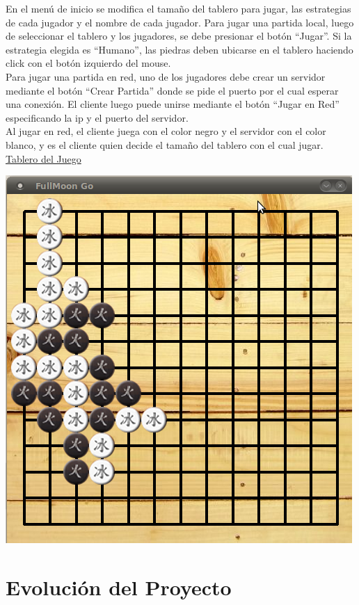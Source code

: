 \documentclass[11pt]{article}
\begin{document}
En el men\'u de inicio se modifica el tama\~no del tablero para jugar, las estrategias de cada jugador y el nombre de cada jugador.
Para jugar una partida local, luego de seleccionar el tablero y los jugadores, se debe presionar el bot\'on ``Jugar''. Si la estrategia
elegida es ``Humano'', las piedras deben ubicarse en el tablero haciendo click con el bot\'on izquierdo del mouse. \\
Para jugar una partida en red, uno de los jugadores debe crear un servidor mediante el bot\'on ``Crear Partida'' donde se pide
el puerto por el cual esperar una conexi\'on. El cliente luego puede unirse mediante el bot\'on ``Jugar en Red'' especificando
la ip y el puerto del servidor.\\ 
Al jugar en red, el cliente juega con el color negro y el servidor con el color blanco, y es el cliente quien decide
el tama\~no del tablero con el cual jugar.\\


\underline{Tablero del Juego}
\begin{center}
 \includegraphics[scale=0.55]{./Diagramas/captura_tablero.png}
\end{center}

\newpage
\section{Evoluci\'on del Proyecto}
\end{document}

